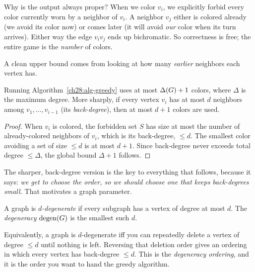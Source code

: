 \begin{whybox}
Why is the output always proper? When we color $v_i$, we explicitly forbid every
color currently worn by a neighbor of $v_i$. A neighbor $v_j$ either is colored
already (we avoid its color now) or comes later (it will avoid \emph{our} color
when its turn arrives). Either way the edge $v_iv_j$ ends up bichromatic. So
correctness is free; the entire game is the \emph{number} of colors.
\end{whybox}

A clean upper bound comes from looking at how many \emph{earlier} neighbors each
vertex has.

\begin{proposition}
\label{ch28:prop-degree}
Running Algorithm~\ref{ch28:alg-greedy} uses at most $\Delta(G)+1$ colors, where
$\Delta$ is the maximum degree. More sharply, if every vertex $v_i$ has at most $d$
neighbors among $v_1,\dots,v_{i-1}$ (its \emph{back-degree}), then at most $d+1$
colors are used.
\end{proposition}

\begin{proof}
When $v_i$ is colored, the forbidden set $S$ has size at most the number of
already-colored neighbors of $v_i$, which is its back-degree, $\le d$. The smallest
color avoiding a set of size $\le d$ is at most $d+1$. Since back-degree never
exceeds total degree $\le\Delta$, the global bound $\Delta+1$ follows.
\end{proof}

The sharper, back-degree version is the key to everything that follows, because it
says: \emph{we get to choose the order, so we should choose one that keeps
back-degrees small.} That motivates a graph parameter.

\begin{definition}[Degeneracy]
\label{ch28:def-degen}
A graph is \emph{$d$-degenerate} if every subgraph has a vertex of degree at most
$d$. The \emph{degeneracy} $\operatorname{degen}(G)$ is the smallest such $d$.
\end{definition}

Equivalently, a graph is $d$-degenerate iff you can repeatedly delete a vertex of
degree $\le d$ until nothing is left. Reversing that deletion order gives an
ordering in which every vertex has back-degree $\le d$. This is the
\emph{degeneracy ordering}, and it is the order you want to hand the greedy
algorithm.

